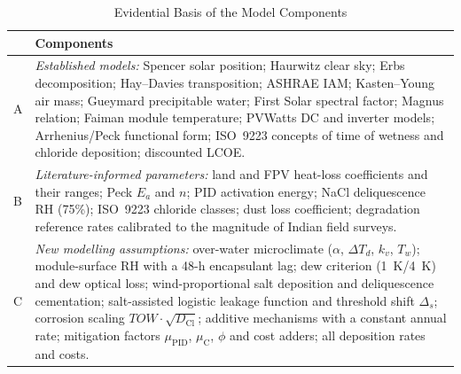 \documentclass[journal]{IEEEtran}
\newcommand{\TOWsym}{\mathit{TOW}}
\begin{document}
\begin{table}[!t]
\caption{Evidential Basis of the Model Components}
\label{tab:evidence}
\centering
\scriptsize
\setlength{\tabcolsep}{2pt}
\begin{tabular}{@{}p{4mm}p{78mm}@{}}
\toprule
 & Components \\
\midrule
A & \emph{Established models:} Spencer solar position; Haurwitz clear sky; Erbs decomposition; Hay--Davies
transposition; ASHRAE IAM; Kasten--Young air mass; Gueymard precipitable water; First Solar spectral factor; Magnus
relation; Faiman module temperature; PVWatts DC and inverter models; Arrhenius/Peck functional form; ISO~9223 concepts
of time of wetness and chloride deposition; discounted LCOE. \\
B & \emph{Literature-informed parameters:} land and FPV heat-loss coefficients and their ranges; Peck $E_a$ and $n$;
PID activation energy; NaCl deliquescence RH (75\%); ISO~9223 chloride classes; dust loss coefficient; degradation
reference rates calibrated to the magnitude of Indian field surveys. \\
C & \emph{New modelling assumptions:} over-water microclimate ($\alpha$, $\Delta T_d$, $k_v$, $T_w$); module-surface RH
with a 48-h encapsulant lag; dew criterion (1~K/4~K) and dew optical loss; wind-proportional salt deposition and
deliquescence cementation; salt-assisted logistic leakage function and threshold shift $\Delta_s$; corrosion scaling
$\TOWsym\cdot\sqrt{D_{\mathrm{Cl}}}$; additive mechanisms with a constant annual rate; mitigation factors
$\mu_{\mathrm{PID}}$, $\mu_{\mathrm{C}}$, $\phi$ and cost adders; all deposition rates and costs. \\
\bottomrule
\end{tabular}
\end{table}
\end{document}
